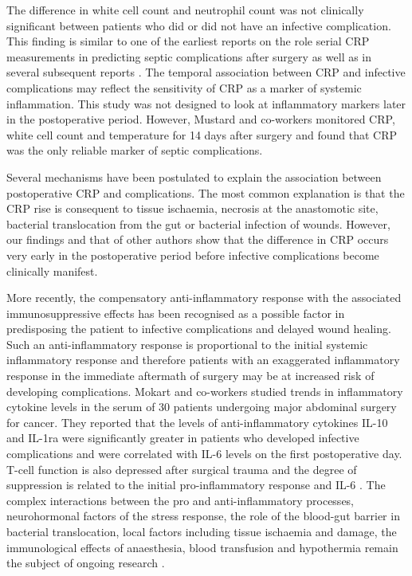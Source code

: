 The difference in white cell count and neutrophil count was not clinically significant between patients who did or did not have an infective complication. 
This finding is similar to one of the earliest reports on the role serial CRP measurements in predicting septic complications after surgery \parencite{mustard_c-reactive_1987} as well as in several subsequent reports \parencite{matthiessen_increase_2008, welsch_persisting_2008, dutta_persistent_2011}. 
The temporal association between CRP and infective complications may reflect the sensitivity of CRP as a marker of systemic inflammation. 
This study was not designed to look at inflammatory markers later in the postoperative period. 
However, Mustard and co-workers monitored CRP, white cell count and temperature for 14 days after surgery and found that CRP was the only reliable marker of septic complications.

Several mechanisms have been postulated to explain the association between postoperative CRP and complications. 
The most common explanation is that the CRP rise is consequent to tissue ischaemia, necrosis at the anastomotic site, bacterial translocation from the gut or bacterial infection of wounds. 
However, our findings and that of other authors show that the difference in CRP occurs very early in the postoperative period before infective complications become clinically manifest. 

More recently, the compensatory anti-inflammatory response with the associated immunosuppressive effects has been recognised as a possible factor in predisposing the patient to infective complications and delayed wound healing. 
Such an anti-inflammatory response is proportional to the initial systemic inflammatory response and therefore patients with an exaggerated inflammatory response in the immediate aftermath of surgery may be at increased risk of developing complications. 
Mokart and co-workers studied trends in inflammatory cytokine levels in the serum of 30 patients undergoing major abdominal surgery for cancer. 
They reported that the levels of anti-inflammatory cytokines IL-10 and IL-1ra were significantly greater in patients who developed infective complications and were correlated with IL-6 levels on the first postoperative day. 
T-cell function is also depressed after surgical trauma and the degree of suppression is related to the initial pro-inflammatory response and IL-6 \parencite{faist_immunosuppression_1997}. 
The complex interactions between the pro and anti-inflammatory processes, neurohormonal factors of the stress response, the role of the blood-gut barrier in bacterial translocation, local factors including tissue ischaemia and damage, the immunological effects of anaesthesia, blood transfusion and hypothermia remain the subject of ongoing research \parencite{buttenschoen_effect_2010}.


